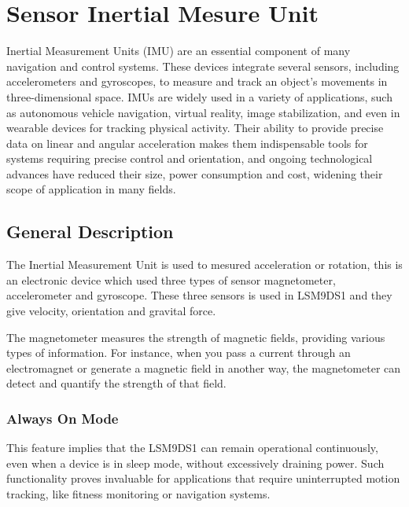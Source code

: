 \chapter{Sensor Inertial Mesure Unit}

Inertial Measurement Units (IMU) are an essential component of many navigation and control systems. These devices integrate several sensors, including accelerometers and gyroscopes, to measure and track an object's movements in three-dimensional space. IMUs are widely used in a variety of applications, such as autonomous vehicle navigation, virtual reality, image stabilization, and even in wearable devices for tracking physical activity. Their ability to provide precise data on linear and angular acceleration makes them indispensable tools for systems requiring precise control and orientation, and ongoing technological advances have reduced their size, power consumption and cost, widening their scope of application in many fields. 
\cite{st_lsm9ds1:2025} \cite{analogdevices:2024} 


\section{General Description }

The Inertial Measurement Unit is used to mesured acceleration or rotation, this is an electronic device which used three types of sensor magnetometer, accelerometer and gyroscope. These three sensors is used in LSM9DS1 and they give velocity, orientation and gravital force. 

The magnetometer measures the strength of magnetic fields, providing various types of information. For instance, when you pass a current through an electromagnet or generate a magnetic field in another way, the magnetometer can detect and quantify the strength of that field. \cite{st_microelectronics:2024}
\cite{STMicroelectronics_LSM9DS1:2024}

\subsection{Always On Mode}

This feature implies that the LSM9DS1 can remain operational continuously, even when a device is in sleep mode, without excessively draining power. Such functionality proves invaluable for applications that require uninterrupted motion tracking, like fitness monitoring or navigation systems. \cite{st_microelectronics:2024}

